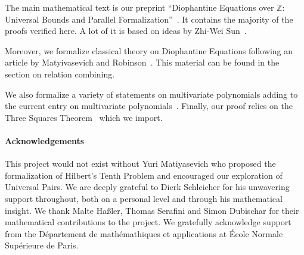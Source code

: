 \documentclass[11pt,a4paper]{article}
\begin{document}
The main mathematical text is our preprint 
``Diophantine Equations over $\mathbb Z$: Universal Bounds and Parallel Formalization''~\cite{manuscript}. 
It contains the majority of the proofs verified here. A lot of it is based on ideas by Zhi-Wei Sun~\cite{Sun, SunDFI}. 

Moreover, we formalize classical theory on Diophantine Equations following an article by 
Matyivasevich and Robinson~\cite{MR75}. This material can be found in the section on relation combining. 

We also formalize a variety of statements on multivariate polynomials adding to the current entry
on multivariate polynomials~\cite{polynomials-afp}. Finally, our proof relies on the 
Three Squares Theorem~\cite{three-squares-afp} which we import.


\paragraph{Acknowledgements}
This project would not exist without Yuri Matiyasevich who proposed the formalization of 
Hilbert's Tenth Problem and encouraged our exploration of Universal Pairs. We are deeply grateful 
to Dierk Schleicher for his unwavering support throughout, both on a personal level and through his 
mathematical insight. We thank Malte Haßler, Thomas Serafini and Simon Dubischar for their 
mathematical contributions to the project.
%
We gratefully acknowledge support from the D\'epartement de math\'emathiques et applications 
at \'Ecole Normale Sup\'erieure de Paris.

\newpage





\end{document}
